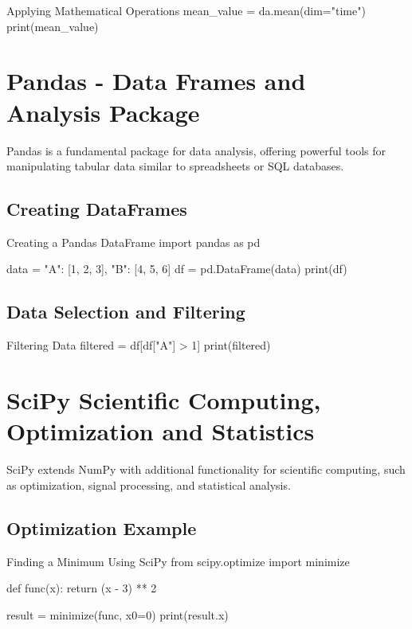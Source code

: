 \begin{codeonly}{Applying Mathematical Operations}
mean_value = da.mean(dim="time")
print(mean_value)
\end{codeonly}

\section{Pandas - Data Frames and Analysis Package}
Pandas is a fundamental package for data analysis, offering powerful tools for manipulating tabular data similar to spreadsheets or SQL databases.

\subsection{Creating DataFrames}

\begin{codeonly}{Creating a Pandas DataFrame}
import pandas as pd

data = {"A": [1, 2, 3], "B": [4, 5, 6]}
df = pd.DataFrame(data)
print(df)
\end{codeonly}

\subsection{Data Selection and Filtering}

\begin{codeonly}{Filtering Data}
filtered = df[df["A"] > 1]
print(filtered)
\end{codeonly}

\section{SciPy Scientific Computing, Optimization and Statistics}
SciPy extends NumPy with additional functionality for scientific computing, such as optimization, signal processing, and statistical analysis.

\subsection{Optimization Example}

\begin{codeonly}{Finding a Minimum Using SciPy}
from scipy.optimize import minimize

def func(x):
    return (x - 3) ** 2

result = minimize(func, x0=0)
print(result.x)
\end{codeonly}

